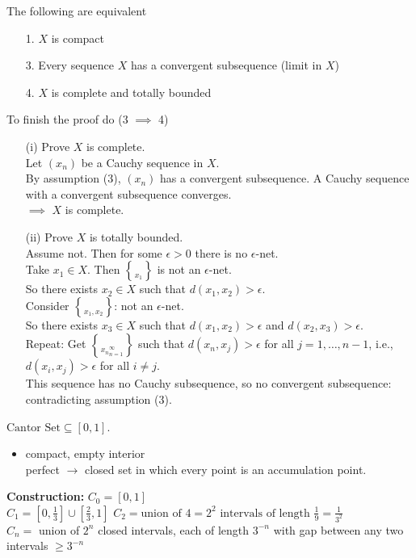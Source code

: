 \thm The following are equivalent
\begin{enumerate}
\item[1.] $X$ is compact
\item[3.] Every sequence $X$ has a convergent subsequence (limit in $X$)
\item[4.] $X$ is complete and totally bounded
\end{enumerate}
To finish the proof do (3 $\implies$ 4)
\begin{enumerate}
\item[(i)] Prove $X$ is complete. \\
Let $(x_n)$ be a Cauchy sequence in $X$. \\
By assumption (3), $(x_n)$ has a convergent subsequence.  A Cauchy sequence with a convergent subsequence converges. \\
$\implies$ $X$ is complete.
\item[(ii)] Prove $X$ is totally bounded. \\
Assume not.  Then for some $\epsilon>0$ there is no $\epsilon$-net. \\
Take $x_1\in X$.  Then $\brace{x_1}$ is not an $\epsilon$-net. \\
So there exists $x_2\in X$ such that $d(x_1,x_2)>\epsilon$. \\
Consider $\brace{x_1,x_2}$: not an $\epsilon$-net. \\
So there exists $x_3\in X$ such that $d(x_1,x_2)>\epsilon$ and $d(x_2,x_3)>\epsilon$. \\
Repeat: Get $\brace{x_n}_{n=1}^\infty$ such that $d(x_n,x_j)>\epsilon$ for all $j=1,\dotsc,n-1$, i.e., $d(x_i,x_j)>\epsilon$ for all $i\neq j$. \\
This sequence has no Cauchy subsequence, so no convergent subsequence: contradicting assumption (3).
\end{enumerate}
\ex $\text{Cantor Set}\subseteq[0,1]$.
\begin{itemize}
\item compact, empty interior \\
perfect $\to$ closed set in which every point is an accumulation point.
\end{itemize}
\textbf{Construction:}
$C_0=[0,1]$ \\
$C_1=[0,\frac13]\cup[\frac23,1]$
$C_2=\text{union of $4=2^2$ intervals of length $\frac19=\frac{1}{3^2}$}$ \\
$C_n=$ union of $2^n$ closed intervals, each of length $3^{-n}$ with gap between any two intervals $\geq3^{-n}$

